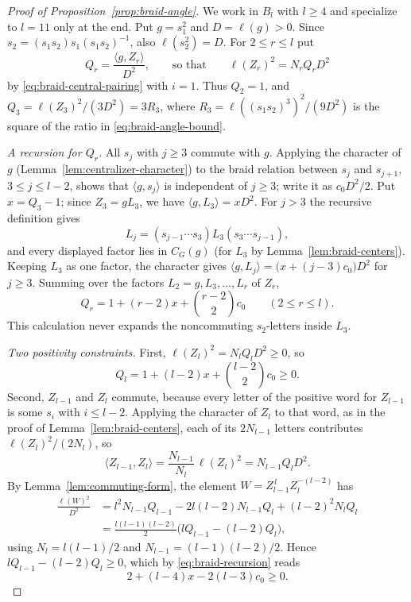 \begin{proof}[Proof of Proposition~\ref{prop:braid-angle}]
We work in $B_l$ with $l\ge4$ and specialize to $l=11$ only at the end.
Put $g=s_1^2$ and $D=\ell(g)>0$.  Since
$s_2=(s_1s_2)s_1(s_1s_2)^{-1}$, also $\ell(s_2^2)=D$.  For
$2\le r\le l$ put
\[
 Q_r=\frac{\langle g,Z_r\rangle}{D^2},\qquad\text{so that}\qquad
 \ell(Z_r)^2=N_rQ_rD^2
\]
by \eqref{eq:braid-central-pairing} with $i=1$.  Thus $Q_2=1$, and
$Q_3=\ell(Z_3)^2/(3D^2)=3R_3$, where
$R_3=\ell((s_1s_2)^3)^2/(9D^2)$ is the square of the ratio in
\eqref{eq:braid-angle-bound}.

\emph{A recursion for $Q_r$.}
All $s_j$ with $j\ge3$ commute with $g$.  Applying the character of $g$
(Lemma~\ref{lem:centralizer-character}) to the braid relation between
$s_j$ and $s_{j+1}$, $3\le j\le l-2$, shows that $\langle g,s_j\rangle$
is independent of $j\ge3$; write it as $c_0D^2/2$.  Put
$x=Q_3-1$; since $Z_3=gL_3$, we have $\langle g,L_3\rangle=xD^2$.
For $j>3$ the recursive definition gives
\[
 L_j=(s_{j-1}\cdots s_3)L_3(s_3\cdots s_{j-1}),
\]
and every displayed factor lies in $C_G(g)$ (for $L_3$ by
Lemma~\ref{lem:braid-centers}).  Keeping $L_3$ as one factor, the
character gives $\langle g,L_j\rangle=\bigl(x+(j-3)c_0\bigr)D^2$ for
$j\ge3$.  Summing over the factors $L_2=g,L_3,\ldots,L_r$ of $Z_r$,
\begin{equation}\label{eq:braid-recursion}
 Q_r=1+(r-2)x+\binom{r-2}{2}c_0\qquad(2\le r\le l).
\end{equation}
This calculation never expands the noncommuting $s_2$-letters inside
$L_3$.

\emph{Two positivity constraints.}
First, $\ell(Z_l)^2=N_lQ_lD^2\ge0$, so
\begin{equation}\label{eq:top-center}
 Q_l=1+(l-2)x+\binom{l-2}{2}c_0\ge0.
\end{equation}
Second, $Z_{l-1}$ and $Z_l$ commute, because every letter of the positive
word for $Z_{l-1}$ is some $s_i$ with $i\le l-2$.  Applying the
character of $Z_l$ to that word, as in the proof of
Lemma~\ref{lem:braid-centers}, each of its $2N_{l-1}$ letters
contributes $\ell(Z_l)^2/(2N_l)$, so
\[
 \langle Z_{l-1},Z_l\rangle=\frac{N_{l-1}}{N_l}\,\ell(Z_l)^2
 =N_{l-1}Q_lD^2.
\]
By Lemma~\ref{lem:commuting-form}, the element
$W=Z_{l-1}^{\,l}Z_l^{-(l-2)}$ has
\begin{align*}
 \frac{\ell(W)^2}{D^2}
 &=l^2N_{l-1}Q_{l-1}-2l(l-2)N_{l-1}Q_l+(l-2)^2N_lQ_l\\
 &=\frac{l(l-1)(l-2)}{2}\bigl(lQ_{l-1}-(l-2)Q_l\bigr),
\end{align*}
using $N_l=l(l-1)/2$ and $N_{l-1}=(l-1)(l-2)/2$.  Hence
$lQ_{l-1}-(l-2)Q_l\ge0$, which by \eqref{eq:braid-recursion} reads
\begin{equation}\label{eq:adjacent-centers}
 2+(l-4)x-2(l-3)c_0\ge0.
\end{equation}


\end{proof}
